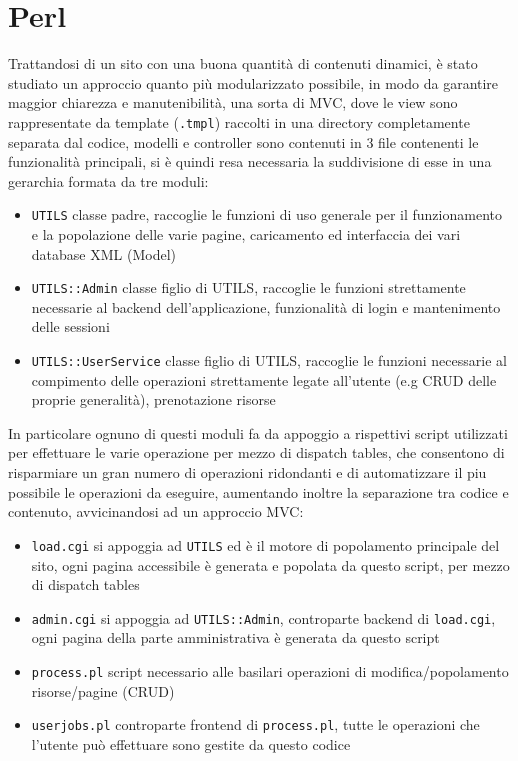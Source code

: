 \section{Perl}

Trattandosi di un sito con una buona quantità di contenuti dinamici, è stato studiato un approccio quanto più modularizzato possibile, in modo da garantire maggior chiarezza e manutenibilità, una sorta di MVC, dove le view sono rappresentate da template (\texttt{.tmpl}) raccolti in una directory completamente separata dal codice, modelli e controller sono contenuti in 3 file contenenti le funzionalità principali, si è quindi resa necessaria la suddivisione di esse in una gerarchia formata da tre moduli:

\begin{itemize}

  \item \texttt{UTILS} classe padre, raccoglie le funzioni di uso generale per il funzionamento e la popolazione delle varie pagine, caricamento ed interfaccia dei vari database XML (Model)
  \item \texttt{UTILS::Admin} classe figlio di UTILS, raccoglie le funzioni strettamente necessarie al backend dell'applicazione, funzionalità di login e mantenimento delle sessioni
  \item \texttt{UTILS::UserService} classe figlio di UTILS, raccoglie le funzioni necessarie al compimento delle operazioni strettamente legate all'utente (e.g CRUD delle proprie generalità), prenotazione risorse

\end{itemize}

In particolare ognuno di questi moduli fa da appoggio a rispettivi script utilizzati per effettuare le varie operazione per mezzo di dispatch tables, che consentono di risparmiare un gran numero di operazioni ridondanti e di automatizzare il piu possibile le operazioni da eseguire, aumentando inoltre la separazione tra codice e contenuto, avvicinandosi ad un approccio MVC:

\begin{itemize}

  \item \texttt{load.cgi} si appoggia ad \texttt{UTILS} ed è il motore di popolamento principale del sito, ogni pagina accessibile è generata e popolata da questo script, per mezzo di dispatch tables
  \item \texttt{admin.cgi} si appoggia ad \texttt{UTILS::Admin}, controparte backend di \texttt{load.cgi}, ogni pagina della parte amministrativa è generata da questo script
  \item \texttt{process.pl} script necessario alle basilari operazioni di modifica/popolamento risorse/pagine (CRUD)
  \item \texttt{userjobs.pl} controparte frontend di \texttt{process.pl}, tutte le operazioni che l'utente può effettuare sono gestite da questo codice

\end{itemize}
